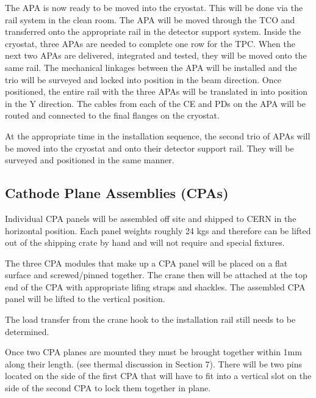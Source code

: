 
The APA is now ready to be moved into the cryostat.  This will be done via the rail system in the clean room.  The APA will be moved through the TCO and transferred onto the appropriate rail in the detector support system.  Inside the cryostat, three APAs are needed to complete one row for the TPC.  When the next two APAs are delivered, integrated and tested, they will be moved onto the same rail.  The mechanical linkages between the APA will be installed and the trio will be surveyed and locked into position in the beam direction.  Once positioned, the entire rail with the three APAs will be translated in into position in the Y direction.  The cables from each of the CE and PDs on the APA will be routed and connected to the final flanges on the cryostat.  

At the appropriate time in the installation sequence, the second trio of APAs will be moved into the cryostat and onto their detector support rail.  They will be surveyed and positioned in the same manner.


\subsection{Cathode Plane Assemblies (CPAs)}



Individual CPA panels will be assembled off site and shipped to CERN in the horizontal position.  Each panel weights roughly 24 kgs and therefore can be lifted out of the shipping crate by hand and will not require and special fixtures.

The three CPA modules that make up a CPA panel will be placed on a flat surface and screwed/pinned together.   The crane then will be attached at the top end of the CPA with appropriate lifing straps and shackles.  The assembled CPA panel will be lifted to the vertical position.  

The load transfer from the crane hook to the installation rail still needs to be determined.  

Once two CPA planes are mounted they must be brought together within 1mm along their length.  (see thermal discussion in Section 7).  There will be two pins located on the side of the first CPA that will have to fit into a vertical slot on the side of the second CPA to lock them together in plane.  

